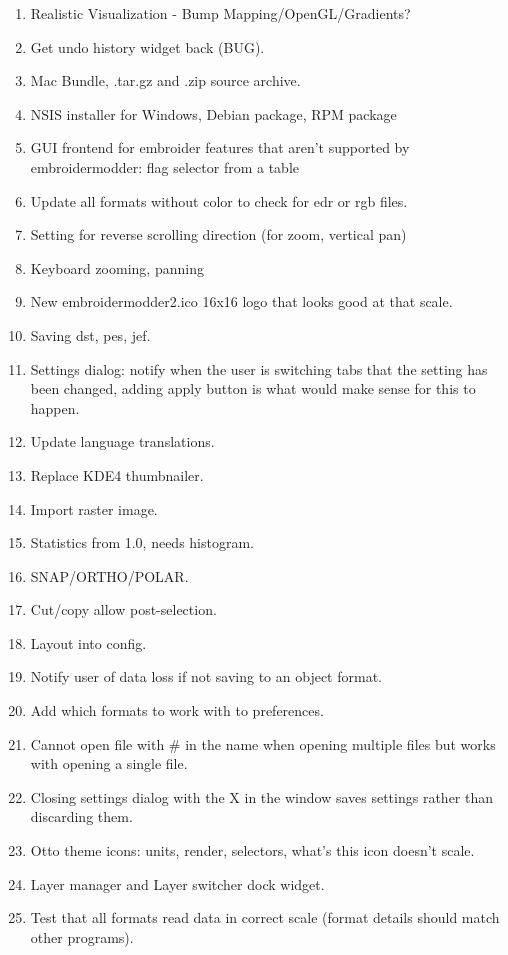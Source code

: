 \documentclass{report}
\begin{document}
\begin{enumerate}
\item Realistic Visualization - Bump Mapping/OpenGL/Gradients?
\item Get undo history widget back (BUG).
\item Mac Bundle, .tar.gz and .zip source archive.
\item NSIS installer for Windows, Debian package, RPM package
\item GUI frontend for embroider features that aren't supported by embroidermodder: flag selector from a table
\item Update all formats without color to check for edr or rgb files.
\item Setting for reverse scrolling direction (for zoom, vertical pan)
\item Keyboard zooming, panning
\item  New embroidermodder2.ico 16x16 logo that looks good at that scale.
\item Saving dst, pes, jef.
\item Settings dialog: notify when the user is switching tabs that the setting has been changed, adding apply button is what would make sense for this to happen.
\item Update language translations.
\item Replace KDE4 thumbnailer.
\item Import raster image.
\item Statistics from 1.0, needs histogram.
\item SNAP/ORTHO/POLAR.
\item Cut/copy allow post-selection.
\item Layout into config.
\item Notify user of data loss if not saving to an object format.
\item Add which formats to work with to preferences.
\item Cannot open file with \# in the name when opening multiple files but works with opening a single file.
\item Closing settings dialog with the X in the window saves settings rather than discarding them.
\item Otto theme icons: units, render, selectors, what's this icon doesn't scale.
\item Layer manager and Layer switcher dock widget.
\item Test that all formats read data in correct scale (format details should match other programs).

\end{enumerate}
\end{document}

